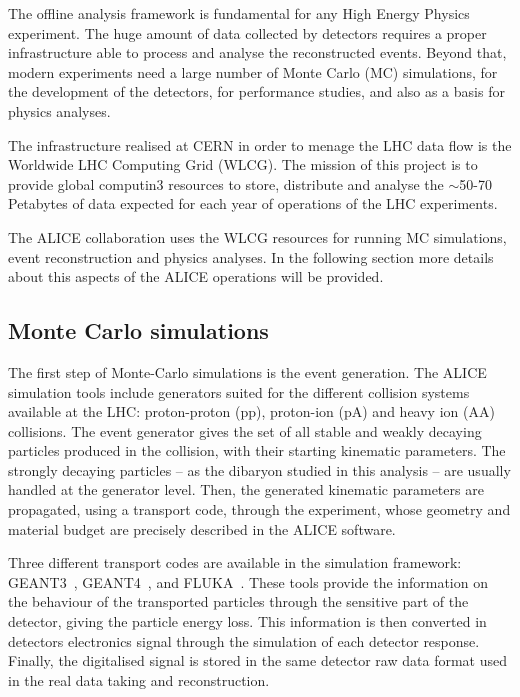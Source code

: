 The offline analysis framework is fundamental for any High Energy Physics experiment.
The huge amount of data collected by detectors requires a proper infrastructure able to process and 
analyse the reconstructed events.
Beyond that, modern experiments need a large number of Monte Carlo (MC) simulations, for the
development of the detectors, for performance studies, and also as a basis for physics analyses.

The infrastructure realised at CERN in order to menage the LHC data flow is the Worldwide 
LHC Computing Grid (WLCG). The mission of this project is to provide global 
computin3 resources to store, distribute and analyse the $\sim$50-70 Petabytes of data expected for 
each year of operations of the LHC experiments.

The ALICE collaboration uses the WLCG resources for running MC simulations, event reconstruction and
physics analyses. 
In the following section more details about this aspects of the ALICE operations will be provided.

%
\subsection{Monte Carlo simulations} \label{sec:montecarlo}

The first step of Monte-Carlo simulations is the event generation. 
The ALICE simulation tools include generators suited for the different collision systems available at
the LHC: proton-proton (pp), proton-ion (pA) and heavy ion (AA) collisions.
The event generator gives the set of all stable and weakly decaying particles produced in the
collision, with their starting kinematic parameters. 
The strongly decaying particles -- as the \dst dibaryon studied in this analysis -- are usually 
handled at the generator level.
Then, the generated kinematic parameters are propagated, using a transport code, through the
experiment, whose geometry and material budget are precisely described in the ALICE software.

Three different transport codes are available in the simulation framework: GEANT3~\cite{geant3},
GEANT4~\cite{geant4}, and FLUKA~\cite{fluka1,fluka2}.
These tools provide the information on the behaviour of the transported particles through the sensitive
part of the detector, giving the particle energy loss. 
This information is then converted in detectors electronics signal through the simulation of each
detector response.
Finally, the digitalised signal is stored in the same detector raw data format used in the 
real data taking and reconstruction.

